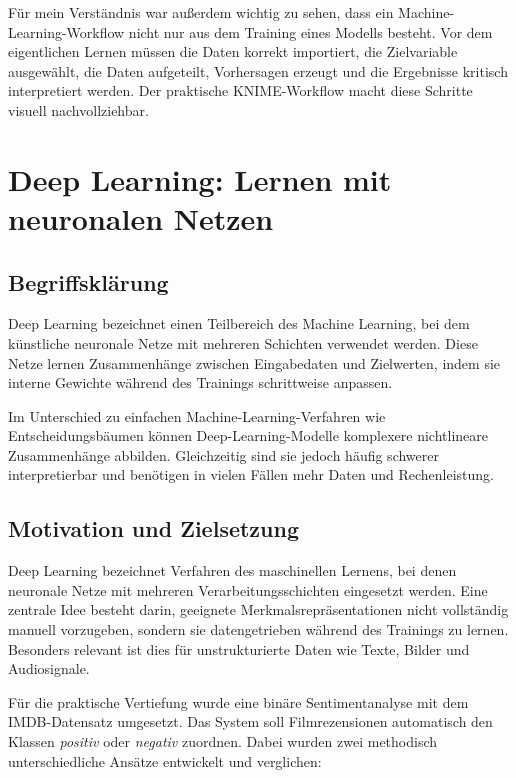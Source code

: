\documentclass[12pt,a4paper]{article}
\begin{document}
Für mein Verständnis war außerdem wichtig zu sehen, dass ein Machine-Learning-Workflow nicht nur aus dem Training eines Modells besteht. Vor dem eigentlichen Lernen müssen die Daten korrekt importiert, die Zielvariable ausgewählt, die Daten aufgeteilt, Vorhersagen erzeugt und die Ergebnisse kritisch interpretiert werden. Der praktische KNIME-Workflow macht diese Schritte visuell nachvollziehbar.

\section{Deep Learning: Lernen mit neuronalen Netzen}

\subsection*{Begriffsklärung}

Deep Learning bezeichnet einen Teilbereich des Machine Learning, bei dem künstliche neuronale Netze mit mehreren Schichten verwendet werden. Diese Netze lernen Zusammenhänge zwischen Eingabedaten und Zielwerten, indem sie interne Gewichte während des Trainings schrittweise anpassen.

Im Unterschied zu einfachen Machine-Learning-Verfahren wie Entscheidungsbäumen können Deep-Learning-Modelle komplexere nichtlineare Zusammenhänge abbilden. Gleichzeitig sind sie jedoch häufig schwerer interpretierbar und benötigen in vielen Fällen mehr Daten und Rechenleistung.



\subsection{Motivation und Zielsetzung}

Deep Learning bezeichnet Verfahren des maschinellen Lernens, bei denen neuronale Netze mit mehreren Verarbeitungsschichten eingesetzt werden. Eine zentrale Idee besteht darin, geeignete Merkmalsrepräsentationen nicht vollständig manuell vorzugeben, sondern sie datengetrieben während des Trainings zu lernen. Besonders relevant ist dies für unstrukturierte Daten wie Texte, Bilder und Audiosignale. 

Für die praktische Vertiefung wurde eine binäre Sentimentanalyse mit dem IMDB-Datensatz umgesetzt. Das System soll Filmrezensionen automatisch den Klassen \emph{positiv} oder \emph{negativ} zuordnen. Dabei wurden zwei methodisch unterschiedliche Ansätze entwickelt und verglichen:
\end{document}
